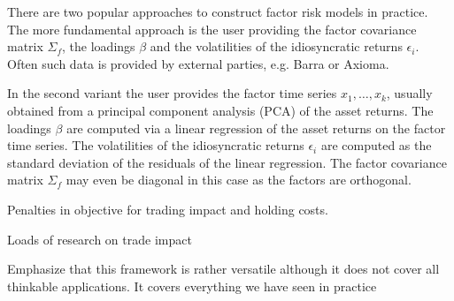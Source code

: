 \documentclass[12pt]{article}
\begin{document}
There are two popular approaches to construct factor risk models in practice.
The more fundamental approach is the user providing the factor covariance matrix $\Sigma_f$,
the loadings $\beta$ and the volatilities of the idiosyncratic returns $\epsilon_i$.
Often such data is provided by external parties, e.g. Barra or Axioma.

In the second variant the user provides the factor time series $x_1, \ldots, x_k$, usually obtained from
a principal component analysis (PCA) of the asset returns. The loadings $\beta$ are computed
via a linear regression of the asset returns on the factor time series.
The volatilities of the idiosyncratic returns $\epsilon_i$ are computed as the standard deviation
of the residuals of the linear regression.
The factor covariance matrix $\Sigma_f$ may even be diagonal in this case as the factors are orthogonal.


















Penalties in objective for trading impact and holding costs.

Loads of research on trade impact


Emphasize that this framework is rather versatile although it does not cover all 
thinkable applications.
It covers everything we have seen in practice
\end{document}
